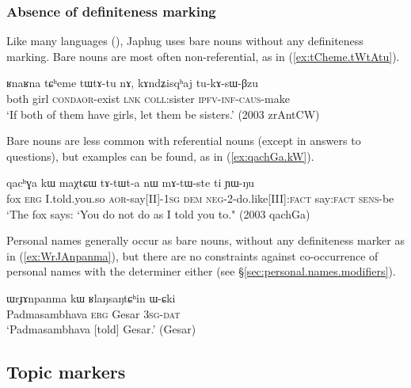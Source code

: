\subsubsection{Absence of definiteness marking} \label{sec:non.overt.definite}
Like many languages (\citealt[130]{creissels06sgit1}), Japhug uses bare nouns without any definiteness marking. Bare nouns are most often non-referential, as  in (\ref{ex:tCheme.tWtAtu}).

\begin{exe}
\ex \label{ex:tCheme.tWtAtu}
\gll ʁnaʁna tɕʰeme tɯ\redp{}tɤ-tu nɤ, kɤndʑisqʰaj tu-kɤ-sɯ-βzu \\
both girl \textsc{cond}\redp{}\textsc{aor}-exist \textsc{lnk} \textsc{coll}:sister \textsc{ipfv}-\textsc{inf}-\textsc{caus}-make \\
\glt `If both of them have girls, let them be sisters.' (2003 zrAntCW)
\end{exe}

Bare nouns are less common with referential nouns (except in answers to questions), but examples can be found, as  in (\ref{ex:qachGa.kW}).

\begin{exe}
\ex \label{ex:qachGa.kW}
\gll qacʰɣa kɯ maχtɕɯ tɤ-tɯt-a nɯ mɤ-tɯ-ste ti ɲɯ-ŋu \\
fox \textsc{erg} I.told.you.so \textsc{aor}-say[II]-\textsc{1sg} \textsc{dem} \textsc{neg}-2-do.like[III]:\textsc{fact} say:\textsc{fact} \textsc{sens}-be \\
\glt `The fox says: `You do not do as I told you to." (2003 qachGa)
\end{exe}

Personal names generally occur as bare nouns, without any definiteness marker as in (\ref{ex:WrJAnpanma}), but there are no constraints against co-occurrence of personal names with the determiner  either (see §\ref{sec:personal.names.modifiers}).

\begin{exe}
\ex \label{ex:WrJAnpanma}
\gll  ɯrɟɤnpanma kɯ ʁlaŋsaŋtɕʰin ɯ-ɕki  \\
 Padmasambhava \textsc{erg} Gesar \textsc{3sg}-\textsc{dat} \\
\glt `Padmasambhava [told] Gesar.' (Gesar)
\end{exe}

 \subsection{Topic markers} \label{sec:topic}
 
